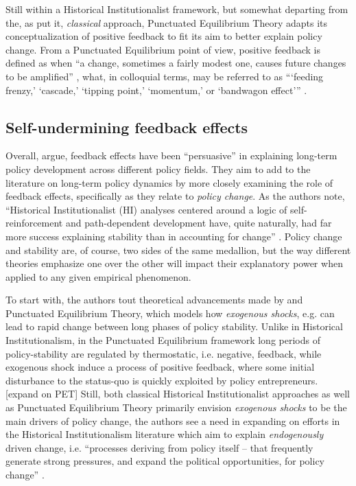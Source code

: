\documentclass[11pt]{article}
\begin{document}
Still within a Historical Institutionalist framework, but somewhat departing from the, as \textcite{Jacobs2014} put it, \textit{classical} approach, Punctuated Equilibrium Theory \parencites{Baumgartner2009}{Baumgartner2002} adapts its conceptualization of positive feedback to fit its aim to better explain policy change. From a Punctuated Equilibrium point of view, positive feedback is defined as when \enquote{a change, sometimes a fairly modest one, causes future changes to be amplified} \parencite[p. 61]{Baumgartner2018}, what, in colloquial terms, may be referred to as \enquote{\enquote{feeding frenzy,} \enquote{cascade,} \enquote{tipping point,} \enquote{momentum,} or \enquote{bandwagon effect}} .

\subsection*{Self-undermining feedback effects}
Overall, \textcite[][]{Jacobs2014} argue, feedback effects have been \enquote{persuasive}  in explaining long-term policy development across different policy fields. They aim to add to the literature on long-term policy dynamics by more closely examining the role of feedback effects, specifically as they relate to \textit{policy change}. As the authors note, \enquote{Historical Institutionalist (HI) analyses centered around a logic of self-reinforcement and path-dependent development have, quite naturally, had far more success explaining stability than in accounting for change} \parencite[][p. 443]{Jacobs2014}. Policy change and stability are, of course, two sides of the same medallion, but the way different theories emphasize one over the other will impact their explanatory power when applied to any given empirical phenomenon.

To start with, the authors tout theoretical advancements made by \textcite[][]{Baumgartner2002} and Punctuated Equilibrium Theory, which models how \textit{exogenous shocks}, e.g. can lead to rapid change between long phases of policy stability. Unlike in Historical Institutionalism, in the Punctuated Equilibrium framework long periods of policy-stability are regulated by thermostatic, i.e. negative, feedback, while exogenous shock induce a process of positive feedback, where some initial disturbance to the status-quo is quickly exploited by policy entrepreneurs. {\color{red}[expand on PET]} Still, both classical Historical Institutionalist approaches as well as Punctuated Equilibrium Theory primarily envision \textit{exogenous shocks} to be the main drivers of policy change, the authors see a need in expanding on efforts in the Historical Institutionalism literature which aim to explain \textit{endogenously} driven change, i.e. \enquote{processes deriving from policy itself -- that frequently generate strong pressures, and expand the political opportunities, for policy change} \parencite[p. 442]{Jacobs2014}.
\end{document}
